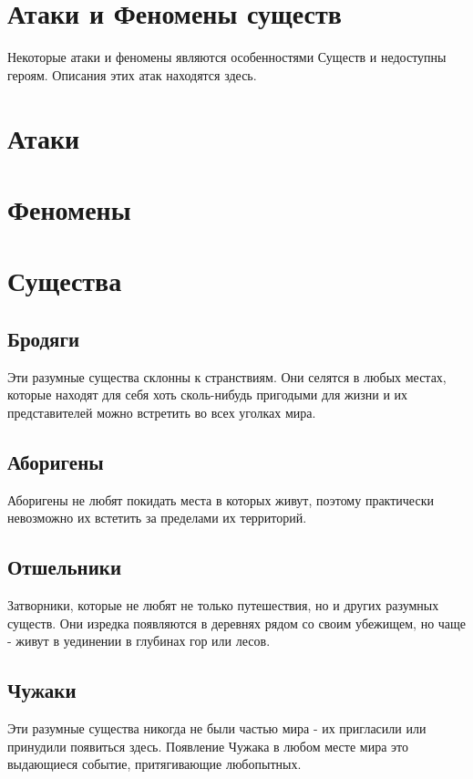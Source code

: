 \section{Атаки и Феномены существ}
Некоторые атаки и феномены являются особенностями Существ и недоступны героям. Описания этих атак находятся здесь.
\section{Атаки}
\section{Феномены}

\section{Существа}
\subsection{Бродяги}
Эти разумные существа склонны к странствиям. Они селятся в любых местах, которые находят для себя хоть сколь-нибудь пригодыми для жизни и их представителей можно встретить во всех уголках мира.

\subsection{Аборигены}
Аборигены не любят покидать места в которых живут, поэтому практически невозможно их встетить за пределами их территорий.

\subsection{Отшельники}
Затворники, которые не любят не только путешествия, но и других разумных существ. Они изредка появляются в деревнях рядом со своим убежищем, но чаще - живут в уединении в глубинах гор или лесов.

\subsection{Чужаки}
Эти разумные существа никогда не были частью мира - их пригласили или принудили появиться здесь. Появление Чужака в любом месте мира это выдающиеся событие, притягивающие любопытных.

